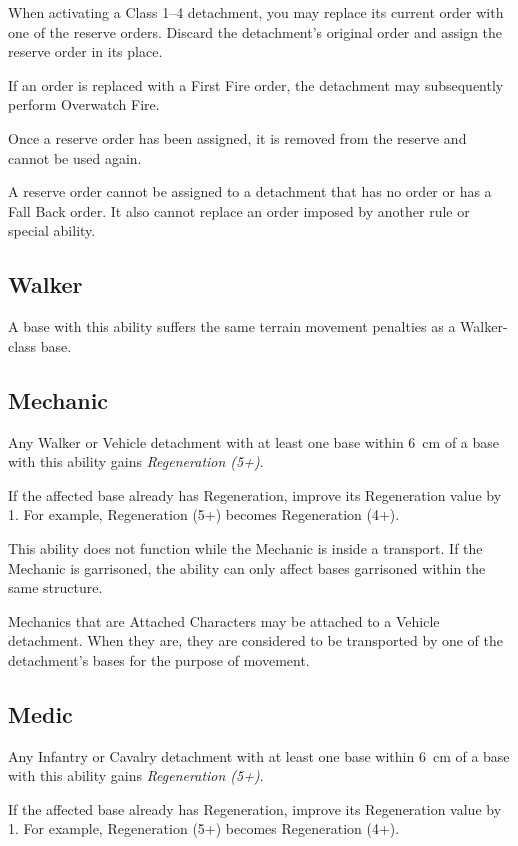 When activating a Class 1--4 detachment, you may replace its current order with one of the reserve orders. Discard the detachment's original order and assign the reserve order in its place.

If an order is replaced with a First Fire order, the detachment may subsequently perform Overwatch Fire.

Once a reserve order has been assigned, it is removed from the reserve and cannot be used again.

A reserve order cannot be assigned to a detachment that has no order or has a Fall Back order. It also cannot replace an order imposed by another rule or special ability.

\subsection{Walker}

A base with this ability suffers the same terrain movement penalties as a Walker-class base.

\subsection{Mechanic}

Any Walker or Vehicle detachment with at least one base within 6~cm of a base with this ability gains \textit{Regeneration (5+)}.

If the affected base already has Regeneration, improve its Regeneration value by 1. For example, Regeneration (5+) becomes Regeneration (4+).

This ability does not function while the Mechanic is inside a transport. If the Mechanic is garrisoned, the ability can only affect bases garrisoned within the same structure.

Mechanics that are Attached Characters may be attached to a Vehicle detachment. When they are, they are considered to be transported by one of the detachment's bases for the purpose of movement.

\subsection{Medic}

Any Infantry or Cavalry detachment with at least one base within 6~cm of a base with this ability gains \textit{Regeneration (5+)}.

If the affected base already has Regeneration, improve its Regeneration value by 1. For example, Regeneration (5+) becomes Regeneration (4+).

